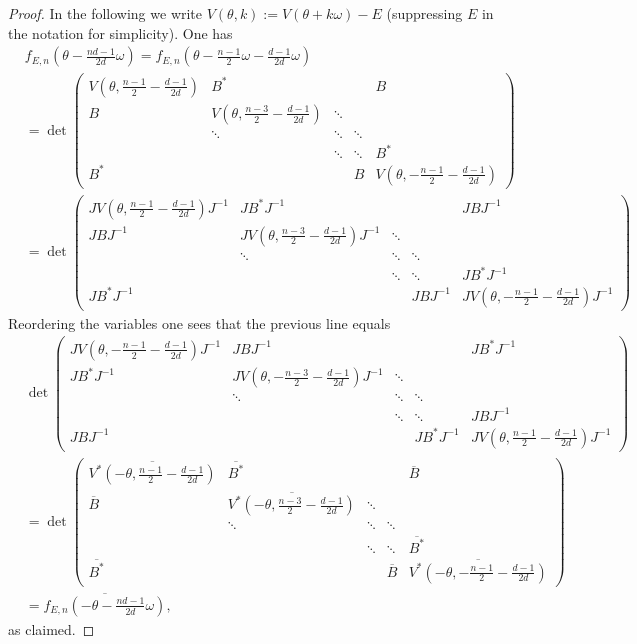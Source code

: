 \documentclass[11pt]{amsart}
\begin{document}
\begin{proof}
In the following we write $V(\theta,k):=V(\theta+k\omega)-E$ (suppressing $E$ in the notation for simplicity).
One has 
\begin{align}
&f_{E,n}(\theta-\frac{nd-1}{2d}\omega)=f_{E,n}(\theta-\frac{n-1}{2}\omega-\frac{d-1}{2d}\omega)\\
&=
\det\left(\begin{matrix}
V(\theta,\frac{n-1}{2}-\frac{d-1}{2d}) & B^* & &  &B\\
B &V(\theta,\frac{n-3}{2}-\frac{d-1}{2d}) &\ddots \\
& \ddots &\ddots &\ddots \\
& &\ddots &\ddots &B^*\\
B^* & & &B &V(\theta,-\frac{n-1}{2}-\frac{d-1}{2d})
\end{matrix}\right)\\
    &=\det\left(\begin{matrix}
    JV(\theta,\frac{n-1}{2}-\frac{d-1}{2d})J^{-1} & JB^*J^{-1} & &  &\!\!\!\!JBJ^{-1}\\
JBJ^{-1} &\!\!\!\!JV(\theta,\frac{n-3}{2}-\frac{d-1}{2d})J^{-1} &\ddots \\
& \ddots &\ddots &\ddots \\
& &\ddots &\ddots &\!\!\!\!JB^*J^{-1}\\
JB^*J^{-1} & & &JBJ^{-1} &\!\!\!\!JV(\theta,-\frac{n-1}{2}-\frac{d-1}{2d})J^{-1} 
    \end{matrix}\right)
    \end{align}
Reordering the variables one sees that the previous line equals
    \begin{align}
  &\det\left(\begin{matrix}
    JV(\theta,-\frac{n-1}{2}-\frac{d-1}{2d})J^{-1} & JBJ^{-1} & &  &\!\!\!\! JB^*J^{-1}\\
JB^*J^{-1} &JV(\theta,-\frac{n-3}{2}-\frac{d-1}{2d})J^{-1} &\ddots \\
& \ddots &\ddots &\ddots \\
& &\ddots &\ddots &\!\!\!\! JBJ^{-1}\\
JBJ^{-1} & & &JB^*J^{-1} &\!\!\!\! JV(\theta,\frac{n-1}{2}-\frac{d-1}{2d})J^{-1} 
    \end{matrix}\right)\\
    &=\det\left(\begin{matrix}
    \overline{V^*(-\theta,\frac{n-1}{2}-\frac{d-1}{2d})} & \overline{B^*} & &  &\overline{B}\\
\overline{B} &\overline{V^*(-\theta,\frac{n-3}{2}-\frac{d-1}{2d})} &\ddots \\
& \ddots &\ddots &\ddots \\
& &\ddots &\ddots &\overline{B^*}\\
\overline{B^*} & & &\overline{B} &\overline{V^*(-\theta,-\frac{n-1}{2}-\frac{d-1}{2d})}
    \end{matrix}\right) \\
&=\overline{f_{E,n}(-\theta-\frac{nd-1}{2d}\omega)}, 
\end{align}
as claimed.
\end{proof}
\end{document}
